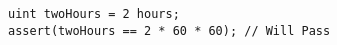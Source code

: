 \begin{lstlisting}[language=Solidity]
uint twoHours = 2 hours;
assert(twoHours == 2 * 60 * 60); // Will Pass

\end{lstlisting}